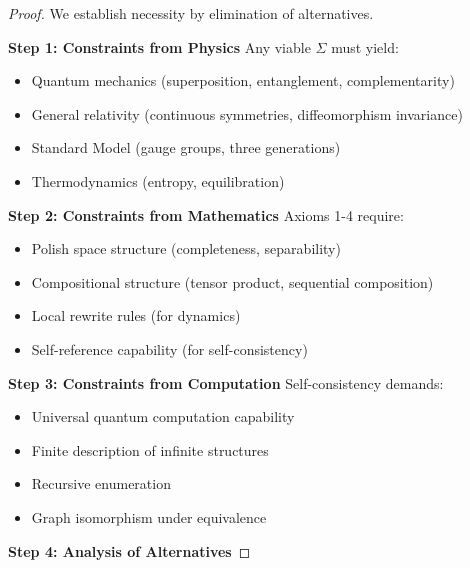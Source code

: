 \documentclass[11pt]{article}
\theoremstyle{definition}
\newcommand{\configspace}{\Sigma}
\begin{document}
\begin{proof}
We establish necessity by elimination of alternatives.

\textbf{Step 1: Constraints from Physics}
Any viable $\configspace$ must yield:
\begin{itemize}
\item Quantum mechanics (superposition, entanglement, complementarity)
\item General relativity (continuous symmetries, diffeomorphism invariance)
\item Standard Model (gauge groups, three generations)
\item Thermodynamics (entropy, equilibration)
\end{itemize}

\textbf{Step 2: Constraints from Mathematics}
Axioms 1-4 require:
\begin{itemize}
\item Polish space structure (completeness, separability)
\item Compositional structure (tensor product, sequential composition)
\item Local rewrite rules (for dynamics)
\item Self-reference capability (for self-consistency)
\end{itemize}

\textbf{Step 3: Constraints from Computation}
Self-consistency demands:
\begin{itemize}
\item Universal quantum computation capability
\item Finite description of infinite structures
\item Recursive enumeration
\item Graph isomorphism under equivalence
\end{itemize}

\textbf{Step 4: Analysis of Alternatives}


\end{proof}
\end{document}
